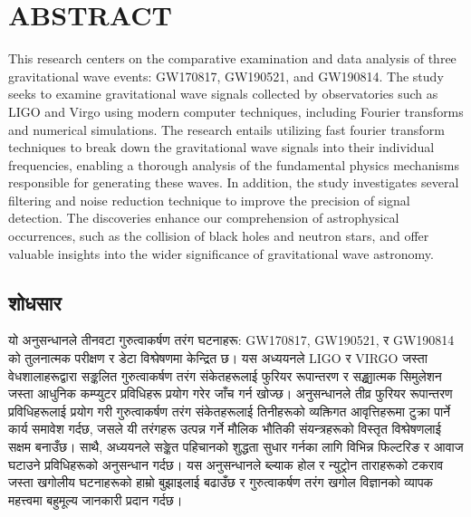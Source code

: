 \chapter*{ABSTRACT}

This research centers on the comparative examination and data analysis of three gravitational wave events: GW170817, GW190521, and GW190814. The study seeks to examine gravitational wave signals collected by observatories such as LIGO and Virgo using modern computer techniques, including Fourier transforms and numerical simulations. The research entails utilizing fast fourier transform techniques to break down the gravitational wave signals into their individual frequencies, enabling a thorough analysis of the fundamental physics mechanisms responsible for generating these waves. In addition, the study investigates several filtering and noise reduction technique to improve the precision of signal detection. The discoveries enhance our comprehension of astrophysical occurrences, such as the collision of black holes and neutron stars, and offer valuable insights into the wider significance of gravitational wave astronomy.

\vspace{0.5cm}


\newpage
\begin{nepali}
	\chapter*{शोधसार}
\end{nepali}
\begin{sanskrit}		
	\noindent \small यो अनुसन्धानले तीनवटा गुरुत्वाकर्षण तरंग घटनाहरू: GW170817, GW190521, र GW190814 को तुलनात्मक परीक्षण र डेटा विश्लेषणमा केन्द्रित छ। यस अध्ययनले LIGO र VIRGO जस्ता वेधशालाहरूद्वारा सङ्कलित गुरुत्वाकर्षण तरंग संकेतहरूलाई फुरियर रूपान्तरण र सङ्ख्यात्मक सिमुलेशन जस्ता आधुनिक कम्प्युटर प्रविधिहरू प्रयोग गरेर जाँच गर्न खोज्छ। अनुसन्धानले तीव्र फुरियर रूपान्तरण प्रविधिहरूलाई प्रयोग गरी गुरुत्वाकर्षण तरंग संकेतहरूलाई तिनीहरूको व्यक्तिगत आवृत्तिहरूमा टुक्रा पार्ने कार्य समावेश गर्दछ, जसले यी तरंगहरू उत्पन्न गर्ने मौलिक भौतिकी संयन्त्रहरूको विस्तृत विश्लेषणलाई सक्षम बनाउँछ। साथै, अध्ययनले सङ्केत पहिचानको शुद्धता सुधार गर्नका लागि विभिन्न फिल्टरिङ र आवाज घटाउने प्रविधिहरूको अनुसन्धान गर्दछ। यस अनुसन्धानले ब्ल्याक होल र न्युट्रोन ताराहरूको टकराव जस्ता खगोलीय घटनाहरूको हाम्रो बुझाइलाई बढाउँछ र गुरुत्वाकर्षण तरंग खगोल विज्ञानको व्यापक महत्त्वमा बहुमूल्य जानकारी प्रदान गर्दछ।
\end{sanskrit}

\vspace{0.5cm}
